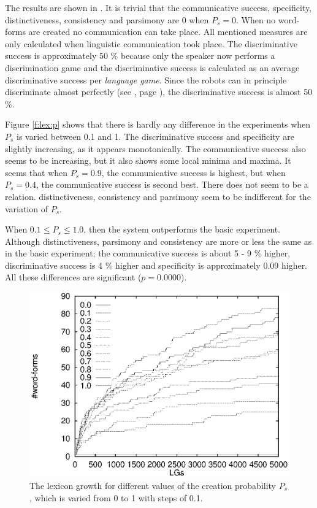 The results are shown in . It is trivial that the communicative success, specificity, distinctiveness, consistency and parsimony are 0 when $P_s=0$. When no word-forms are created no communication can take place. All mentioned measures are only calculated when linguistic communication took place. The discriminative success is approximately 50 \% because only the speaker now performs a discrimination game and the discriminative success is calculated as an average discriminative success per {\em language game}. Since the robots can in principle discriminate almost perfectly (see , page \pageref{f:st:ds}), the discriminative success is almost 50 \%. 

Figure \ref{f:lex:p} shows that there is hardly any difference in the experiments when $P_s$ is varied between 0.1 and 1. The discriminative success and specificity are slightly increasing, as it appears monotonically. The communicative success also seems to be increasing, but it also shows some local minima and maxima. It seems that when $P_s=0.9$, the communicative success is highest, but when $P_s=0.4$, the communicative success is second best. There does not seem to be a relation. distinctiveness, consistency and parsimony seem to be indifferent for the variation of $P_s$.

When $0.1 \leq P_s \leq 1.0$, then the system outperforms the basic experiment. Although distinctiveness, parsimony and consistency are more or less the same as in the basic experiment; the communicative success is about 5 - 9 \% higher, discriminative success is 4 \% higher and specificity is approximately 0.09 higher. All these differences are significant ($p=0.0000$).

\begin{figure}[t]
\centerline{\includegraphics[width=12cm]{lexicon/words.eps}}
\caption{The lexicon growth for different values of the creation probability $P_s$, which is varied from 0 to 1 with steps of 0.1.}
\label{f:lex:words}
\end{figure}

